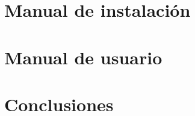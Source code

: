 \documentclass[a4paper,11pt]{book}
\begin{document}
\chapter{Manual de instalación}


\chapter{Manual de usuario}


\chapter{Conclusiones}


\backmatter %


\clearpage
{}





\end{document}
